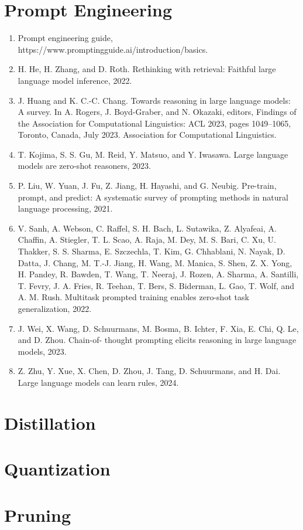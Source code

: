 \documentclass[]{article}
\begin{document}
\section{Prompt Engineering}
\begin{enumerate}
\item Prompt engineering guide, https://www.promptingguide.ai/introduction/basics.
\item H. He, H. Zhang, and D. Roth. Rethinking with retrieval: Faithful large language model inference, 2022.
\item J. Huang and K. C.-C. Chang. Towards reasoning in large language models: A survey. In A. Rogers,
J. Boyd-Graber, and N. Okazaki, editors, Findings of the Association for Computational Linguistics:
ACL 2023, pages 1049–1065, Toronto, Canada, July 2023. Association for Computational Linguistics.
\item T. Kojima, S. S. Gu, M. Reid, Y. Matsuo, and Y. Iwasawa. Large language models are zero-shot reasoners,
2023.
\item P. Liu, W. Yuan, J. Fu, Z. Jiang, H. Hayashi, and G. Neubig. Pre-train, prompt, and predict: A
systematic survey of prompting methods in natural language processing, 2021.
\item V. Sanh, A. Webson, C. Raffel, S. H. Bach, L. Sutawika, Z. Alyafeai, A. Chaffin, A. Stiegler, T. L. Scao,
A. Raja, M. Dey, M. S. Bari, C. Xu, U. Thakker, S. S. Sharma, E. Szczechla, T. Kim, G. Chhablani,
N. Nayak, D. Datta, J. Chang, M. T.-J. Jiang, H. Wang, M. Manica, S. Shen, Z. X. Yong, H. Pandey,
R. Bawden, T. Wang, T. Neeraj, J. Rozen, A. Sharma, A. Santilli, T. Fevry, J. A. Fries, R. Teehan,
T. Bers, S. Biderman, L. Gao, T. Wolf, and A. M. Rush. Multitask prompted training enables zero-shot
task generalization, 2022.
\item J. Wei, X. Wang, D. Schuurmans, M. Bosma, B. Ichter, F. Xia, E. Chi, Q. Le, and D. Zhou. Chain-of-
thought prompting elicits reasoning in large language models, 2023.
\item Z. Zhu, Y. Xue, X. Chen, D. Zhou, J. Tang, D. Schuurmans, and H. Dai. Large language models can
learn rules, 2024.
\end{enumerate}
\section{Distillation}
\section{Quantization}
\section{Pruning}
\end{document}
